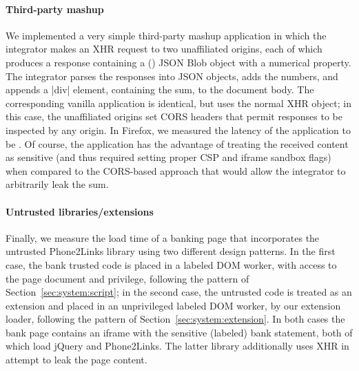 \paragraph{Third-party mashup}

We implemented a very simple third-party mashup application in which
the integrator makes an XHR request to two unaffiliated origins, each
of which produces a response containing a () JSON Blob
object with a numerical property.
%
The integrator parses the responses into JSON objects, adds the
numbers, and appends a \js|div| element, containing the sum, to the
document body.
%
The corresponding vanilla application is identical, but uses the
normal XHR object; in this case, the unaffiliated origins set CORS
headers that permit responses to be inspected by any origin.
%
In Firefox, we measured the latency of the application to be
.
%
Of course, the \sys{} application has the advantage of treating the
received content as sensitive (and thus required setting proper CSP
and iframe sandbox flags) when compared to the CORS-based approach
that would allow the integrator to arbitrarily leak the sum.


\paragraph{Untrusted libraries/extensions}

Finally, we measure the load time of a banking page that incorporates
the untrusted Phone2Links library using two different design patterns.
%
In the first case, the bank trusted code is placed in a labeled DOM
worker, with access to the page document and privilege, following the
pattern of Section~\ref{sec:system:script}; in the second case, the
untrusted code is treated as an extension and placed in an
unprivileged labeled DOM worker, by our extension loader, following
the pattern of Section~\ref{sec:system:extension}.
%
In both cases the bank page contains an iframe with the sensitive
(labeled) bank statement, both of which load jQuery and
Phone2Links.
%
The latter library additionally uses XHR in attempt to leak the page
content.

